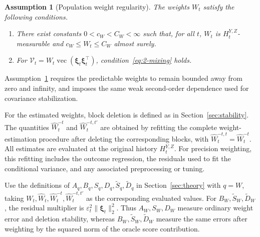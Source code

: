 \documentclass[12pt]{article}
\newtheorem{assumption}[theorem]{Assumption}
\numberwithin{equation}{section}
\begin{document}
\begin{assumption}[Population weight regularity]
\label{ass:population_weights}
The weights \(W_t\) satisfy the following conditions.
\begin{enumerate}
    \item[(i)] There exist constants \(0<c_W<C_W<\infty\) such that, for all
    \(t\), \(W_t\) is \(H_t^{Y,Z}\)-measurable and
    \(c_W\leq W_t\leq C_W\) almost surely.

    \item[(ii)] For
\(\mathcal V_t
=W_t\operatorname{vec}(\boldsymbol\xi_t\boldsymbol\xi_t^\top)\),
condition~\eqref{eq:2-mixing} holds.
\end{enumerate}
\end{assumption}

Assumption~\ref{ass:population_weights} requires the predictable weights to
remain bounded away from zero and infinity, and imposes the same weak
second-order dependence used for covariance stabilization.

For the estimated weights, block deletion is defined as in
Section~\ref{sec:stability}. The quantities \(\hat W_t^{-t}\) and
\(\hat W_t^{-t,t'}\) are obtained by refitting the complete weight-estimation
procedure after deleting the corresponding blocks, with
\(\hat W_t^{-t,t}=\hat W_t^{-t}\). All estimates are evaluated at the original
history \(H_t^{Y,Z}\). For precision weighting, this refitting includes the
outcome regression, the residuals used to fit the conditional variance, and
any associated preprocessing or tuning.

Use the definitions of \(A_q,B_q,S_q,D_q,\tilde S_q,\tilde D_q\)
in Section~\ref{sec:theory} with \(q=W\), taking
\(W_t,\hat W_t,\hat W_t^{-t},\hat W_t^{-t,t'}\) as the corresponding
evaluated values. For \(B_W,\tilde S_W,\tilde D_W\), the
residual multiplier is \(\varepsilon_t^2\|\boldsymbol\xi_t\|_2^2\).
Thus \(A_W,S_W,D_W\) measure ordinary weight error and deletion stability,
whereas \(B_W,\tilde S_W,\tilde D_W\) measure the same errors after weighting
by the squared norm of the oracle score contribution.
\end{document}
